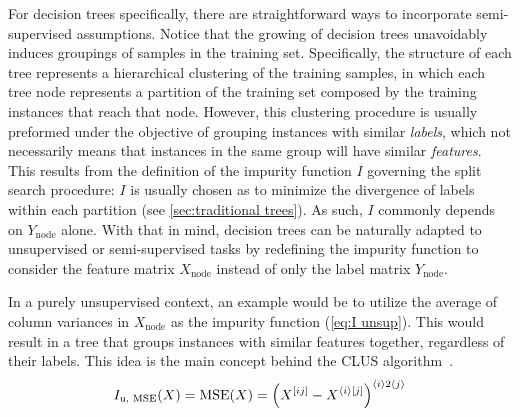 
For decision trees specifically, there are straightforward ways to incorporate semi-supervised assumptions.
%
Notice that the growing of decision trees unavoidably induces groupings of samples in the training set. 
Specifically, the structure of each tree represents a hierarchical clustering of the training samples, in which each tree node represents a partition of the training set composed by the training instances that reach that node.
%
However, this clustering procedure is usually preformed under the objective of grouping instances with similar \emph{labels}, which not necessarily means that instances in the same group will have similar \emph{features}.
%
This results from the definition of the impurity function $I$ governing the split search procedure: $I$ is usually chosen as to minimize the divergence of labels within each partition (see \autoref{sec:traditional trees}). As such, $I$ commonly depends on $Y_\text{node}$ alone.
%
With that in mind, decision trees can be naturally adapted to unsupervised or semi-supervised tasks by redefining the impurity function to consider the feature matrix $X_\text{node}$ instead of only the label matrix $Y_\text{node}$.

In a purely unsupervised context, an example would be to utilize the average of column variances in $X_\text{node}$ as the impurity function (\autoref{eq:I unsup}). This would result in a tree that groups instances with similar features together, regardless of their labels. This idea is the main concept behind the CLUS algorithm~\cite{boley1998unsupervised}.
%
\begin{equation}
    I_\text{u, MSE}(X) = \text{MSE}(X) = \left( X^{[ij]} - X^{\langle i\rangle[j]} \right)^{\langle i\rangle2\langle j\rangle}
    \label{eq:I unsup}
\end{equation}

